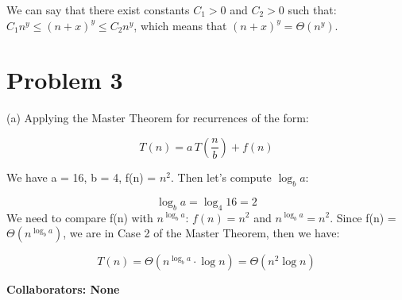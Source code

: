 \documentclass[12 pt]{article}
\begin{document}
We can say that there exist constants $C_1 > 0$ and $C_2 > 0$ such that: $C_1 n^y \leq (n + x)^y \leq C_2 n^y$, which means that
$(n + x)^y = \Theta(n^y)$.

\vspace{1cm}

\section*{Problem 3}
(a) Applying the Master Theorem for recurrences of the form:

\[
T(n) = a\, T\left( \dfrac{n}{b} \right) + f(n)
\]

We have a = 16, b = 4, f(n) = $n^2$. Then let's compute $\log_b a$:

\[
\log_b a = \log_4 16 = 2
\]
We need to compare f(n) with $n^{\log_b a}$: $f(n) = n^2$ and $n^{\log_b a} = n^{2}$. Since f(n) = $\Theta\left( n^{\log_b a} \right)$, we are in Case 2 of the Master Theorem, then we have:

\[
T(n) = \Theta\left( n^{\log_b a} \cdot \log n \right) = \Theta\left( n^2 \log n \right)
\]




\vspace{1cm}

\noindent\textbf{Collaborators: None}
\end{document}
